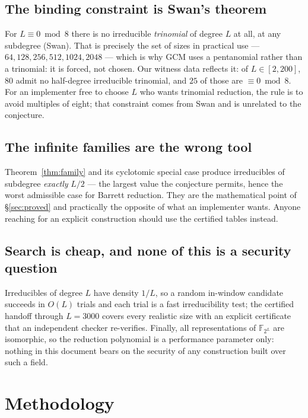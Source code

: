 \documentclass[10pt]{article}
\theoremstyle{plain}
\theoremstyle{definition}
\newcommand{\F}{\mathbb F}
\begin{document}
\subsection{The binding constraint is Swan's theorem}

For $L\equiv0\bmod 8$ there is no irreducible \emph{trinomial} of degree $L$
at all, at any subdegree (Swan). That is precisely the set of sizes in
practical use --- $64,128,256,512,1024,2048$ --- which is why GCM uses a
pentanomial rather than a trinomial: it is forced, not chosen. Our witness
data reflects it: of $L\in[2,200]$, $80$ admit no half-degree irreducible
trinomial, and $25$ of those are $\equiv0\bmod 8$. For an implementer free to
choose $L$ who wants trinomial reduction, the rule is to avoid multiples of
eight; that constraint comes from Swan and is unrelated to the conjecture.

\subsection{The infinite families are the wrong tool}

Theorem~\ref{thm:family} and its cyclotomic special case produce irreducibles of
subdegree \emph{exactly} $L/2$ --- the largest value the conjecture permits,
hence the worst admissible case for Barrett reduction. They are the
mathematical point of \S\ref{sec:proved} and practically the opposite of what
an implementer wants. Anyone reaching for an explicit construction should use
the certified tables instead.

\subsection{Search is cheap, and none of this is a security question}

Irreducibles of degree $L$ have density $1/L$, so a random in-window candidate
succeeds in $O(L)$ trials and each trial is a fast irreducibility test; the
certified handoff through $L=3000$ covers every realistic size with an
explicit certificate that an independent checker re-verifies. Finally, all
representations of $\F_{2^L}$ are isomorphic, so the reduction polynomial is a
performance parameter only: nothing in this document bears on the security of
any construction built over such a field.

\section{Methodology}\label{sec:method}
\end{document}
